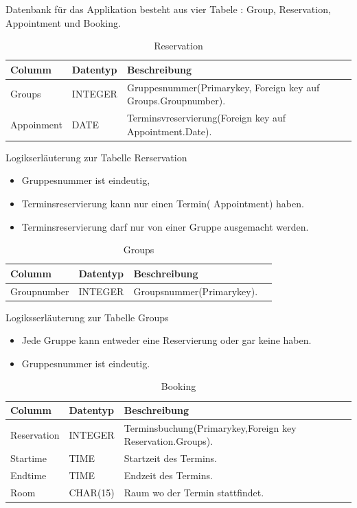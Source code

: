 \documentclass[10pt,a4paper]{article}
\begin{document}
Datenbank für das Applikation besteht aus  vier Tabele : Group, Reservation, Appointment und Booking.

\begin{table}[h]
\centering
	\caption{Reservation}
    \begin{tabular}{| l | l | l |}
    \hline
    \rowcolor{lightgray} Columm & Datentyp & Beschreibung  \\ \hline
    Groups & INTEGER & Gruppesnummer(Primarykey, Foreign key auf Groups.Groupnumber).  \\ \hline
    Appoinment & DATE & Terminsvreservierung(Foreign key auf Appointment.Date). \\ \hline
    \end{tabular}
\end{table}
Logikserläuterung zur Tabelle Rerservation

\begin{itemize}
\item Gruppesnummer ist eindeutig, 
\item Terminsreservierung kann nur einen Termin( Appointment) haben.
\item Terminsreservierung darf nur von einer Gruppe ausgemacht werden.
\end{itemize}
\begin{table}[h]
\centering
\caption{Groups}
    \begin{tabular}{| l | l | l | l |}
    \hline
    \rowcolor{lightgray} Columm & Datentyp & Beschreibung  \\ \hline
    Groupnumber & INTEGER & Groupsnummer(Primarykey).  \\ \hline
   \end{tabular}
\end{table}
Logiksserläuterung zur Tabelle Groups
\begin{itemize}
\item Jede Gruppe kann entweder eine Reservierung oder gar keine haben. 
\item Gruppesnummer ist eindeutig.
\end{itemize}

\begin{table}[h]
\centering
\caption{Booking}
    \begin{tabular}{| l | l | l | l |}
    \hline
    \rowcolor{lightgray} Columm & Datentyp & Beschreibung  \\ \hline
    Reservation  & INTEGER & Terminsbuchung(Primarykey,Foreign key Reservation.Groups). \\ \hline
    Startime & TIME & Startzeit des Termins. \\ \hline
    Endtime & TIME & Endzeit des Termins. \\ \hline
    Room & CHAR(15) & Raum wo der Termin stattfindet. \\ \hline
    \end{tabular}
\end{table}
\end{document}

